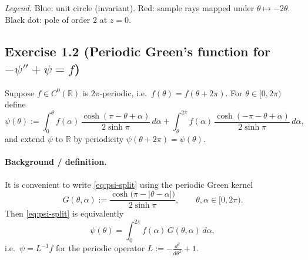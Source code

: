 \documentclass[11pt,a4paper]{article}
\begin{document}
\textit{Legend.}  
Blue: unit circle (invariant).  
Red: sample rays mapped under $\theta \mapsto -2\theta$.  
Black dot: pole of order 2 at $z=0$.


\subsection*{Exercise 1.2 (Periodic Green's function for $-\psi''+\psi=f$)}
Suppose $f\in C^0(\mathbb{R})$ is $2\pi$-periodic, i.e.\ $f(\theta)=f(\theta+2\pi)$. For $\theta\in[0,2\pi)$ define
\begin{equation}\label{eq:psi-split}
	\psi(\theta):=\int_{0}^{\theta} f(\alpha)\,\frac{\cosh(\pi-\theta+\alpha)}{2\sinh\pi}\,d\alpha
	+\int_{\theta}^{2\pi} f(\alpha)\,\frac{\cosh(-\pi-\theta+\alpha)}{2\sinh\pi}\,d\alpha,
\end{equation}
and extend $\psi$ to $\mathbb{R}$ by periodicity $\psi(\theta+2\pi)=\psi(\theta)$.

\paragraph{Background / definition.}
It is convenient to write \eqref{eq:psi-split} using the periodic Green kernel
\begin{equation}\label{eq:Gdef}
	G(\theta,\alpha):=\frac{\cosh\!\big(\pi-|\theta-\alpha|\big)}{2\sinh\pi},\qquad \theta,\alpha\in[0,2\pi).
\end{equation}
Then \eqref{eq:psi-split} is equivalently
\begin{equation}\label{eq:psi-conv}
	\psi(\theta)=\int_{0}^{2\pi} f(\alpha)\,G(\theta,\alpha)\,d\alpha,
\end{equation}
i.e.\ $\psi=L^{-1}f$ for the periodic operator $L:=-\frac{d^2}{d\theta^2}+1$.
\end{document}
